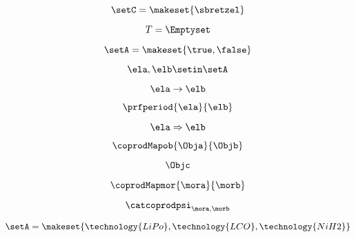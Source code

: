 \begin{forslides}
    \begin{equation}
        \label{eq:feedback-078}
        \setC = \makeset{ \sbretzel }
    \end{equation}

    \begin{equation}
        \label{eq:feedback-079}
        T = \Emptyset
    \end{equation}

    \begin{equation}
        \label{eq:feedback-080}
        \setA = \makeset{ \true, \false }
    \end{equation}

    \begin{equation}
        \label{eq:feedback-081}
        \ela, \elb \setin \setA
    \end{equation}

    \begin{equation}
        \label{eq:feedback-082}
        \ela \to \elb
    \end{equation}

    \begin{equation}
        \label{eq:feedback-083}
        \prfperiod{\ela}{\elb}
    \end{equation}

    \begin{equation}
        \label{eq:feedback-084}
        \ela \Rightarrow \elb
    \end{equation}

    \begin{equation}
        \label{eq:feedback-085}
        \coprodMapob{\Obja}{\Objb}
    \end{equation}

    \begin{equation}
        \label{eq:feedback-086}
        \Objc
    \end{equation}

    \begin{equation}
        \label{eq:feedback-087}
        \coprodMapmor{\mora}{\morb}
    \end{equation}

    \begin{equation}
        \label{eq:feedback-088}
        \catcoprodpsi_{\mora, \morb}
    \end{equation}

    \begin{equation}
        \label{eq:feedback-089}
        \setA=\makeset{\technology{LiPo}, \technology{LCO},\technology{NiH2}}
    \end{equation}


\end{forslides}
